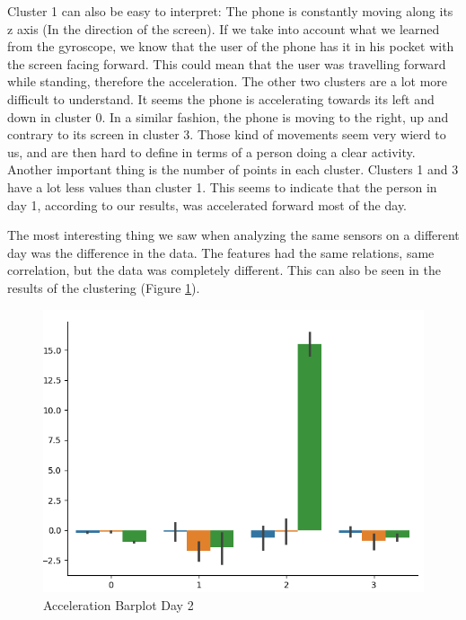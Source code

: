 \documentclass[idxtotoc,hyperref,openany]{labbook} %
\begin{document}
Cluster 1 can also be easy to interpret: The phone is constantly moving along its z axis (In the direction of the screen). If we take into account what we learned from the gyroscope, we know that the user of the phone has it in his pocket with the screen facing forward. This could mean that the user was travelling forward while standing, therefore the acceleration. The other two clusters are a lot more difficult to understand. It seems the phone is accelerating towards its left and down in cluster 0. In a similar fashion, the phone is moving to the right, up and contrary to its screen in cluster 3. Those kind of movements seem very wierd to us, and are then hard to define in terms of a person doing a clear activity. Another important thing is the number of points in each cluster. Clusters 1 and 3 have a lot less values than cluster 1. This seems to indicate that the person in day 1, according to our results, was accelerated forward most of the day.
\clearpage


The most interesting thing we saw when analyzing the same sensors on a different day was the difference in the data. The features had the same relations, same correlation, but the data was completely different. This can also be seen in the results of the clustering (Figure \ref{Acceleration Factorplot 2}).

\begin{figure}[h]
\includegraphics[width=0.9\linewidth]{AccelerometerResultsDay2.png}
\setlength\belowcaptionskip{-10pt}
\caption{Acceleration Barplot Day 2}
\label{Acceleration Factorplot 2}
\end{figure}
\end{document}
